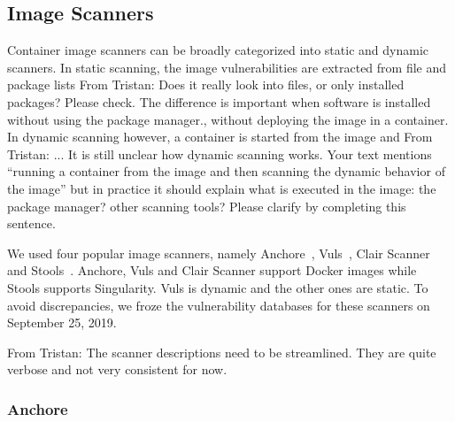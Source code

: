 \documentclass[a4paper,num-refs]{oup-contemporary}
\newcommand{\tristan}[1]{\color{blue}From Tristan: #1\color{black}}
\begin{document}
\subsection{Image Scanners}

Container image scanners can be broadly categorized into static and dynamic
scanners. In static scanning, the image vulnerabilities are extracted from
file and package lists \tristan{Does it really look into files, or only installed packages? Please check. The difference is important 
when software is installed without using the package manager.}, without deploying the image in a container. In
dynamic scanning however, a container is started from the image and
\tristan{... It is still unclear how dynamic scanning works. Your text
mentions ``running a container from the image and then scanning the dynamic
behavior of the image'' but in practice it should explain what is executed
in the image: the package manager? other scanning tools? Please clarify by
completing this sentence.}



We used four popular image scanners, namely Anchore~\cite{github_2019},
Vuls~\cite{future-architect_2019}, Clair Scanner~\cite{arminc_2019} and
Stools~\cite{refneeded}. Anchore, Vuls and Clair Scanner support Docker
images while Stools supports Singularity. Vuls is dynamic and the other
ones are static. To avoid discrepancies, we froze the vulnerability
databases for these scanners on September 25, 2019.


\tristan{The scanner descriptions need to be streamlined. They are quite verbose and not very consistent for now.}

\subsubsection{Anchore}
\end{document}
